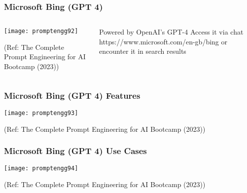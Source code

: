 \begin{frame}[fragile]\frametitle{Microsoft Bing (GPT 4)}


\begin{columns}
    \begin{column}[T]{0.6\linewidth}
		\begin{center}
		\texttt{[image: promptengg92]}

		{\tiny (Ref: The Complete Prompt Engineering for AI Bootcamp (2023))}
		\end{center}	
    \end{column}
    \begin{column}[T]{0.4\linewidth}
		Powered by OpenAI’s GPT-4
		Access it via chat https://www.microsoft.com/en-gb/bing or encounter it in search results
    \end{column}
  \end{columns}
\end{frame}


\begin{frame}[fragile]\frametitle{Microsoft Bing (GPT 4) Features}


		\begin{center}
		\texttt{[image: promptengg93]}

		{\tiny (Ref: The Complete Prompt Engineering for AI Bootcamp (2023))}
		\end{center}	

\end{frame}

\begin{frame}[fragile]\frametitle{Microsoft Bing (GPT 4) Use Cases}


		\begin{center}
		\texttt{[image: promptengg94]}

		{\tiny (Ref: The Complete Prompt Engineering for AI Bootcamp (2023))}
		\end{center}	

\end{frame}



